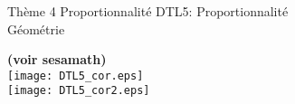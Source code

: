 \documentclass[10pt]{article}
\begin{document}
\begin{encadrementombre} {Thème 4 Proportionnalité}
{\LARGE DTL5: Proportionnalité}\\

{\Large Géométrie}
\end{encadrementombre}



{\setlength{\baselineskip}{1.5\baselineskip}


\begin{Exo} \textbf{(voir sesamath)}\\

\texttt{[image: DTL5\_cor.eps]}\\
\texttt{[image: DTL5\_cor2.eps]}   
\end{Exo}

}
\end{document}
